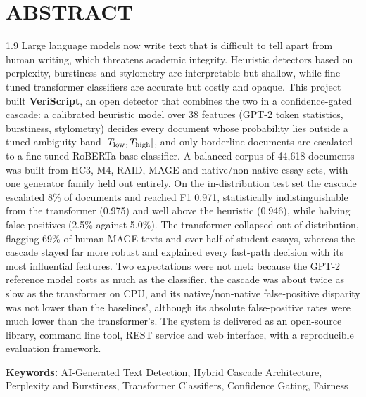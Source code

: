 \chapter*{ABSTRACT}
\begin{spacing}{1.9}
Large language models now write text that is difficult to tell apart from human
writing, which threatens academic integrity. Heuristic detectors based on
perplexity, burstiness and stylometry are interpretable but shallow, while
fine-tuned transformer classifiers are accurate but costly and opaque. This
project built \textbf{VeriScript}, an open detector that combines the two in a
confidence-gated cascade: a calibrated heuristic model over 38 features
(GPT-2 token statistics, burstiness, stylometry) decides every document whose
probability lies outside a tuned ambiguity band $[T_{\mathrm{low}},T_{\mathrm{high}}]$, and only
borderline documents are escalated to a fine-tuned RoBERTa-base classifier. A
balanced corpus of 44,618 documents was built from HC3, M4, RAID, MAGE and
native/non-native essay sets, with one generator family held out entirely. On
the in-distribution test set the cascade escalated 8\% of documents and reached
F1 0.971, statistically indistinguishable from the transformer (0.975) and well
above the heuristic (0.946), while halving false positives (2.5\% against
5.0\%). The transformer collapsed out of distribution, flagging 69\% of human
MAGE texts and over half of student essays, whereas the cascade stayed far more
robust and explained every fast-path decision with its most influential
features. Two expectations were not met: because the GPT-2 reference model costs
as much as the classifier, the cascade was about twice as slow as the
transformer on CPU, and its native/non-native false-positive disparity was not
lower than the baselines', although its absolute false-positive rates were much
lower than the transformer's. The system is delivered as an open-source library,
command line tool, REST service and web interface, with a reproducible
evaluation framework.
\end{spacing}

\vspace{6pt}
\noindent\textbf{Keywords:} AI-Generated Text Detection, Hybrid Cascade
Architecture, Perplexity and Burstiness, Transformer Classifiers, Confidence
Gating, Fairness
\clearpage
